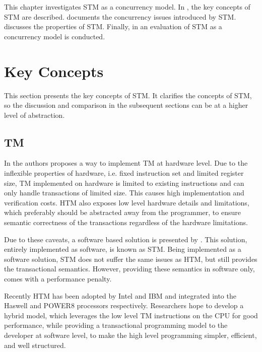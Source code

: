 \makeatletter {}\makeatother
{}
This chapter investigates \ac{STM} as a concurrency model. In , the key concepts of \ac{STM} are described.  documents the concurrency issues introduced by \ac{STM}.  discusses the properties of \ac{STM}. Finally, in  an evaluation of \ac{STM} as a concurrency model is conducted.
\label{chap:stm}

\section{Key Concepts}
\label{sec:stm_keyconcepts}
This section presents the key concepts of \ac{STM}. It clarifies the concepts of \ac{STM}, so the discussion and comparison in the subsequent sections can be at a higher level of abstraction.

\subsection{\acl{TM}}
\label{sec:tmevo}
In \cite{herlihy1993transactional} the authors proposes a way to implement \ac{TM} at hardware level. Due to the inflexible properties of hardware, i.e. fixed instruction set and limited register size, \ac{TM} implemented on hardware is limited to existing instructions and can only handle transactions of limited size\cite{dragojevic2011stm}. This causes high implementation and verification costs\cite{cascaval2008software}. \ac{HTM} also exposes low level hardware details and limitations\cite{herlihy2011tm}, which preferably should be abstracted away from the programmer, to ensure semantic correctness of the transactions regardless of the hardware limitations. 

Due to these caveats, a software based solution is presented by \cite{shavit1997software}. This solution, entirely implemented as software, is known as \acl{STM}. Being implemented as a software solution, \ac{STM} does not suffer the same issues as \ac{HTM}, but still provides the transactional semantics. However, providing these semantics in software only, comes with a performance penalty\cite{cascaval2008software}\cite{dragojevic2011stm}.

Recently \ac{HTM} has been adopted by Intel and IBM and integrated into the Haswell and POWER8 processors respectively\cite{Anthes:2014:RSP:2684442.2667109}. Researchers hope to develop a hybrid model, which leverages the low level \ac{TM} instructions on the \ac{CPU} for good performance, while providing a transactional programming model to the developer at software level, to make the high level programming simpler, efficient, and well structured\cite{Anthes:2014:RSP:2684442.2667109}.

